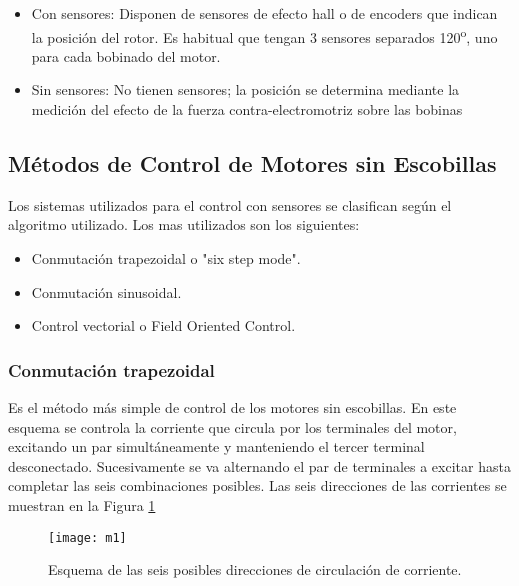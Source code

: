\begin{itemize}
  \item Con sensores: Disponen de sensores de efecto hall o de encoders que indican la posición del rotor. Es habitual que tengan 3 sensores separados 120\textsuperscript{o}, uno para cada bobinado del motor.
  \item Sin sensores: No tienen sensores; la posición se determina mediante la medición del efecto de la fuerza contra-electromotriz sobre las bobinas
\end{itemize}






\subsection{Métodos de Control de Motores sin Escobillas}
\label{subsection: metodos_control_motores}

Los sistemas utilizados para el control con sensores se clasifican según el algoritmo utilizado. Los mas utilizados son los siguientes: 

\begin{itemize}
\item Conmutación trapezoidal o "six step mode".
\item Conmutación sinusoidal.
\item Control vectorial o Field Oriented Control.
\end{itemize}

\subsubsection{Conmutación trapezoidal}
\label{conmutacion_trapezoidal}

Es el método más simple de control de los motores sin escobillas. En este esquema se controla la corriente que circula por los terminales del motor, excitando un par simultáneamente y manteniendo el tercer terminal desconectado. Sucesivamente se va alternando el par de terminales a excitar hasta completar las seis combinaciones posibles. Las seis direcciones de las corrientes se muestran en la Figura \ref{fig:trapezoidal}

\begin{figure}[h]
  \centering
  \texttt{[image: m1]}
  \caption{Esquema de las seis posibles direcciones de circulación de corriente.}\label{fig:trapezoidal}
\end{figure}

